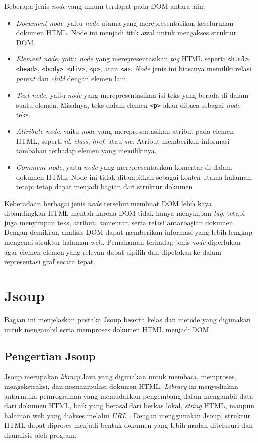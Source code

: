 Beberapa jenis \textit{node} yang umum terdapat pada DOM antara lain:
\begin{itemize}
    \item \textit{Document node}, yaitu \textit{node} utama yang merepresentasikan keseluruhan dokumen HTML. Node ini menjadi titik awal untuk mengakses struktur DOM.
    \item \textit{Element node}, yaitu \textit{node} yang merepresentasikan \textit{tag} HTML seperti \texttt{<html>}, \texttt{<head>}, \texttt{<body>}, \texttt{<div>}, \texttt{<p>}, atau \texttt{<a>}. \textit{Node} jenis ini biasanya memiliki relasi \textit{parent} dan \textit{child} dengan elemen lain.
    \item \textit{Text node}, yaitu \textit{node} yang merepresentasikan isi teks yang berada di dalam suatu elemen. Misalnya, teks dalam elemen \texttt{<p>} akan dibaca sebagai \textit{node} teks.
    \item \textit{Attribute node}, yaitu \textit{node} yang merepresentasikan atribut pada elemen HTML, seperti \textit{id}, \textit{class}, \textit{href}, atau \textit{src}. Atribut memberikan informasi tambahan terhadap elemen yang memilikinya.
    \item \textit{Comment node}, yaitu \textit{node} yang merepresentasikan komentar di dalam dokumen HTML. Node ini tidak ditampilkan sebagai konten utama halaman, tetapi tetap dapat menjadi bagian dari struktur dokumen.
\end{itemize}

Keberadaan berbagai jenis \textit{node} tersebut membuat DOM lebih kaya dibandingkan HTML mentah karena DOM tidak hanya menyimpan \textit{tag}, tetapi juga menyimpan teks, atribut, komentar, serta relasi antarbagian dokumen. Dengan demikian, analisis DOM dapat memberikan informasi yang lebih lengkap mengenai struktur halaman web. Pemahaman terhadap jenis \textit{node} diperlukan agar elemen-elemen yang relevan dapat dipilih dan dipetakan ke dalam representasi graf secara tepat.
 

\section{Jsoup}
Bagian ini menjelaskan pustaka Jsoup beserta kelas dan metode yang digunakan untuk mengambil serta memproses dokumen HTML menjadi DOM.

\subsection{Pengertian Jsoup}
Jsoup merupakan \textit{library} Java yang digunakan untuk membaca, memproses, mengekstraksi, dan memanipulasi dokumen HTML. \textit{Library} ini menyediakan antarmuka pemrograman yang memudahkan pengembang dalam mengambil data dari dokumen HTML, baik yang berasal dari berkas lokal, \textit{string} HTML, maupun halaman web yang diakses melalui \textit{URL}~\cite{jsoup:26:jsoup}. Dengan menggunakan Jsoup, struktur HTML dapat diproses menjadi bentuk dokumen yang lebih mudah ditelusuri dan dianalisis oleh program.

